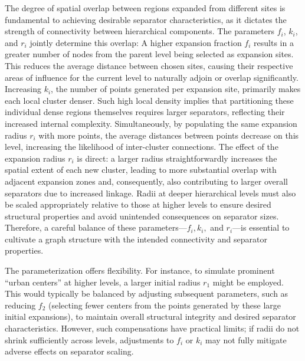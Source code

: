 The degree of spatial overlap between regions expanded from different sites is fundamental to achieving desirable separator characteristics, as it dictates the strength of connectivity between hierarchical components.
The parameters \(f_i\), \(k_i\), and \(r_i\) jointly determine this overlap:
A higher expansion fraction \(f_i\) results in a greater number of nodes from the parent level being selected as expansion sites.
This reduces the average distance between chosen sites, causing their respective areas of influence for the current level to naturally adjoin or overlap significantly.
Increasing \(k_i\), the number of points generated per expansion site, primarily makes each local cluster denser.
Such high local density implies that partitioning these individual dense regions themselves requires larger separators, reflecting their increased internal complexity.
Simultaneously, by populating the same expansion radius \(r_i\) with more points, the average distances between points decrease on this level, increasing the likelihood of inter-cluster connections.
The effect of the expansion radius \(r_i\) is direct: a larger radius straightforwardly increases the spatial extent of each new cluster, leading to more substantial overlap with adjacent expansion zones and, consequently, also contributing to larger overall separators due to increased linkage.
Radii at deeper hierarchical levels must also be scaled appropriately relative to those at higher levels to ensure desired structural properties and avoid unintended consequences on separator sizes.
Therefore, a careful balance of these parameters—\(f_i, k_i,\) and \(r_i\)—is essential to cultivate a graph structure with the intended connectivity and separator properties.

The parameterization offers flexibility.
For instance, to simulate prominent \enquote{urban centers} at higher levels, a larger initial radius \(r_1\) might be employed.
This would typically be balanced by adjusting subsequent parameters, such as reducing \(f_2\) (selecting fewer centers from the points generated by these large initial expansions), to maintain overall structural integrity and desired separator characteristics.
However, such compensations have practical limits; if radii do not shrink sufficiently across levels, adjustments to \(f_i\) or \(k_i\) may not fully mitigate adverse effects on separator scaling.

